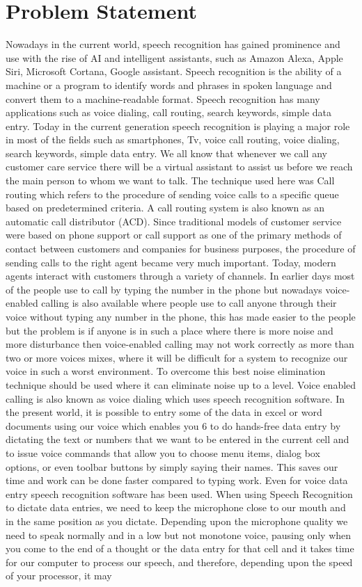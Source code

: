 \section{Problem Statement}
Nowadays in the current world, speech recognition has gained prominence and use with the rise of AI and intelligent assistants, such as Amazon Alexa, Apple Siri, Microsoft Cortana, Google assistant. Speech recognition is the ability of a machine or a program to identify words and phrases in spoken language and convert them to a machine-readable format. Speech recognition has many applications such as voice dialing, call routing, search keywords, simple data entry. Today in the current generation speech recognition is playing a major role in most of the fields such as smartphones, Tv, voice call routing, voice dialing, search keywords, simple data entry. We all know that whenever we call any customer care service there will be a virtual assistant to assist us before we reach the main person to whom we want to talk. The technique used here was Call routing which refers to the procedure of sending voice calls to a specific queue based on predetermined criteria. A call routing system is also known as an automatic call distributor (ACD). Since traditional models of customer service were based on phone support or call support as one of the primary methods of contact between customers and companies for business purposes, the procedure of sending calls to the right agent became very much important. Today, modern agents interact with customers through a variety of channels. In earlier days most of the people use to call by typing the number in the phone but nowadays voice-enabled calling is also available where people use to call anyone through their voice without typing any number in the phone, this has made easier to the people but the problem is if anyone is in such a place where there is more noise and more disturbance then voice-enabled calling may not work correctly as more than two or more voices mixes, where it will be difficult for a system to recognize our voice in such a worst environment. To overcome this best noise elimination technique should be used where it can eliminate noise up to a level. Voice enabled calling is also known as voice dialing which uses speech recognition software. In the present world, it is possible to entry some of the data in excel or word documents using our voice which enables you 6 to do hands-free data entry by dictating the text or numbers that we want to be entered in the current cell and to issue voice commands that allow you to choose menu items, dialog box options, or even toolbar buttons by simply saying their names. This saves our time and work can be done faster compared to typing work. Even for voice data entry speech recognition software has been used. When using Speech Recognition to dictate data entries, we need to keep the microphone close to our mouth and in the same position as you dictate. Depending upon the microphone quality we need to speak normally and in a low but not monotone voice, pausing only when you come to the end of a thought or the data entry for that cell and it takes time for our computer to process our speech, and therefore, depending upon the speed of your processor, it may 